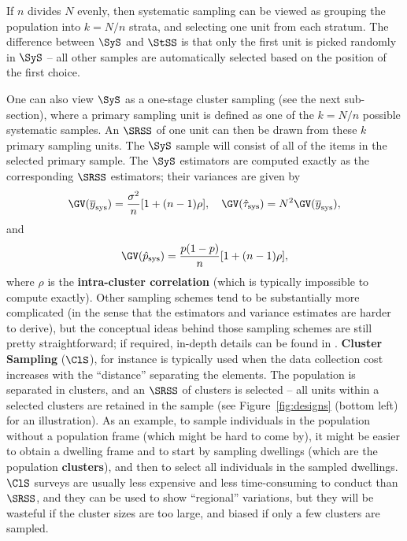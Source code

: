If $n$ divides $N$ evenly, then systematic sampling can be viewed as grouping the population into $k=N/n$ strata, and selecting one unit from each stratum. The difference between $\SyS$ and $\StSS$ is that only the first unit is picked randomly in $\SyS$ -- all other samples are automatically selected based on the position of the first choice. \par One can also view $\SyS$ as a one-stage cluster sampling (see the next sub-section), where a primary sampling unit is defined as one of the $k=N/n$ possible systematic samples. An $\SRSS$ of one unit can then be drawn from these $k$ primary sampling units. The $\SyS$ sample will consist of all of the items in the selected primary sample.
\newl The $\SyS$ estimators are computed exactly as the corresponding $\SRSS$ estimators; their variances are given by  
$$\GV(\overline{y}_{\textrm{sys}})=\frac{\sigma^2}{n}[1+(n-1)\rho],\quad  \GV(\hat{\tau}_{\textrm{sys}})=N^2\GV(\overline{y}_{\textrm{sys}}),$$ and $$\GV(\hat{p}_{\textrm{sys}})=\frac{p(1-p)}{n}[1+(n-1)\rho],$$ where $\rho$ is the \textbf{intra-cluster correlation} (which is typically impossible to compute exactly). \newl Other sampling schemes tend to be substantially more complicated (in the sense that the estimators and variance estimates are harder to derive), but the conceptual ideas behind those sampling schemes are still pretty straightforward; if required, in-depth details can be found in \cite{DC_SC}.
\newl \textbf{Cluster Sampling}
 ($\ClS$), for instance is typically used when the data collection cost increases with the ``distance'' separating the elements. The population is separated in clusters, and an $\SRSS$ of clusters is selected -- all units within a selected clusters are retained in the sample (see Figure~\ref{fig:designs} (bottom left) for an illustration). As an example, to sample individuals in the population without a population frame (which might be hard to come by), it might be easier to obtain a dwelling frame and to start by sampling dwellings (which are the population \textbf{clusters}), and then to select all individuals in the sampled dwellings. $\ClS$ surveys are usually less expensive and less time-consuming to conduct than $\SRSS$, and they can be used to show ``regional'' variations, but they will be wasteful if the cluster sizes are too large, and biased if only a few clusters are sampled.  